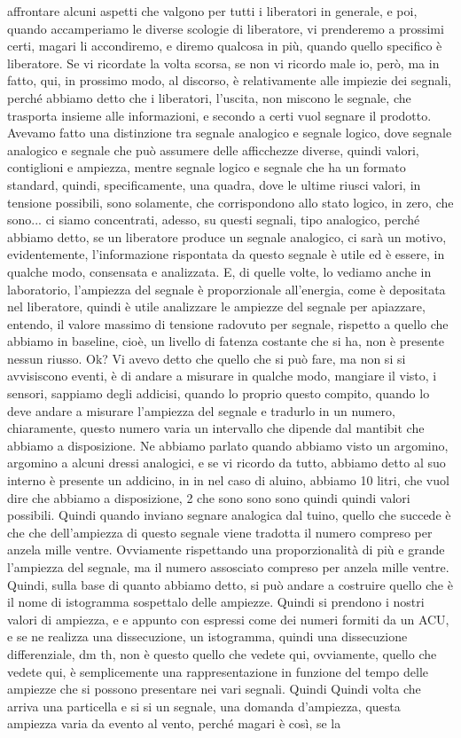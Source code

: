 affrontare alcuni aspetti che valgono per tutti i liberatori in generale, e poi, quando accamperiamo le diverse scologie di liberatore, vi prenderemo a prossimi certi, magari li accondiremo, e diremo qualcosa in più, quando quello specifico è liberatore. Se vi ricordate la volta scorsa, se non vi ricordo male io, però, ma in fatto, qui, in prossimo modo, al discorso, è relativamente alle impiezie dei segnali, perché abbiamo detto che i liberatori, l'uscita, non miscono le segnale, che trasporta insieme alle informazioni, e secondo a certi vuol segnare il prodotto. Avevamo fatto una distinzione tra segnale analogico e segnale logico, dove segnale analogico e segnale che può assumere delle afficchezze diverse, quindi valori, contiglioni e ampiezza, mentre segnale logico e segnale che ha un formato standard, quindi, specificamente, una quadra, dove le ultime riusci valori, in tensione possibili, sono solamente, che corrispondono allo stato logico, in zero, che sono... ci siamo concentrati, adesso, su questi segnali, tipo analogico, perché abbiamo detto, se un liberatore produce un segnale analogico, ci sarà un motivo, evidentemente, l'informazione rispontata da questo segnale è utile ed è essere, in qualche modo, consensata e analizzata. E, di quelle volte, lo vediamo anche in laboratorio, l'ampiezza del segnale è proporzionale all'energia, come è depositata nel liberatore, quindi è utile analizzare le ampiezze del segnale per apiazzare, entendo, il valore massimo di tensione radovuto per segnale, rispetto a quello che abbiamo in baseline, cioè, un livello di fatenza costante che si ha, non è presente nessun riusso. Ok? Vi avevo detto che quello che si può fare, ma non si si avvisiscono eventi, è di andare a misurare in qualche modo, mangiare il visto, i sensori, sappiamo degli addicisi, quando lo proprio questo compito, quando lo deve andare a misurare l'ampiezza del segnale e tradurlo in un numero, chiaramente, questo numero varia un intervallo che dipende dal mantibit che abbiamo a disposizione. Ne abbiamo parlato quando abbiamo visto un argomino, argomino a alcuni dressi analogici, e se vi ricordo da tutto, abbiamo detto al suo interno è presente un addicino, in in nel caso di aluino, abbiamo 10 litri, che vuol dire che abbiamo a disposizione, 2 che sono sono sono quindi quindi valori possibili. Quindi quando inviano segnare analogica dal tuino, quello che succede è che che dell'ampiezza di questo segnale viene tradotta il numero compreso per anzela mille ventre. Ovviamente rispettando una proporzionalità di più e grande l'ampiezza del segnale, ma il numero assosciato compreso per anzela mille ventre. Quindi, sulla base di quanto abbiamo detto, si può andare a costruire quello che è il nome di istogramma sospettalo delle ampiezze. Quindi si prendono i nostri valori di ampiezza, e e appunto con espressi come dei numeri formiti da un ACU, e se ne realizza una dissecuzione, un istogramma, quindi una dissecuzione differenziale, dm th, non è questo quello che vedete qui, ovviamente, quello che vedete qui, è semplicemente una rappresentazione in funzione del tempo delle ampiezze che si possono presentare nei vari segnali. Quindi Quindi volta che arriva una particella e si si un segnale, una domanda d'ampiezza, questa ampiezza varia da evento al vento, perché magari è così, se la 